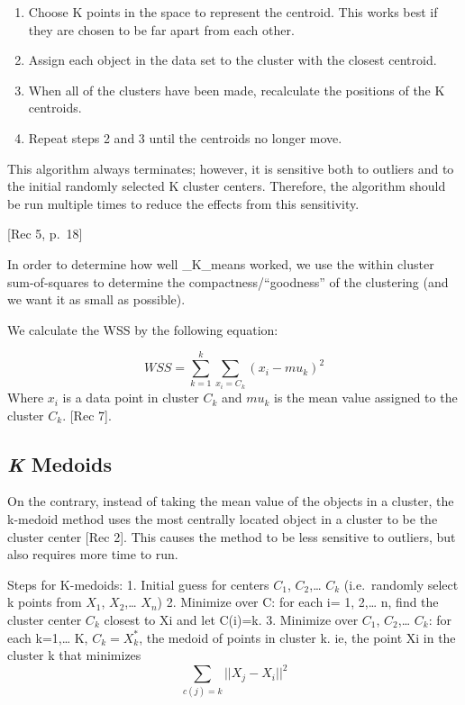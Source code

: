 \documentclass[12pt,twoside]{amherstthesis}
\providecommand{\tightlist}{%
  \setlength{\itemsep}{0pt}\setlength{\parskip}{0pt}}
\begin{document}
  \begin{enumerate}
  \def\labelenumi{\arabic{enumi}.}
  \tightlist
  \item
    Choose K points in the space to represent the centroid. This works
    best if they are chosen to be far apart from each other.
  \item
    Assign each object in the data set to the cluster with the closest
    centroid.
  \item
    When all of the clusters have been made, recalculate the positions of
    the K centroids.
  \item
    Repeat steps 2 and 3 until the centroids no longer move.
  \end{enumerate}
  
  This algorithm always terminates; however, it is sensitive both to
  outliers and to the initial randomly selected K cluster centers.
  Therefore, the algorithm should be run multiple times to reduce the
  effects from this sensitivity.
  
  {[}Rec 5, p.~18{]}
  
  In order to determine how well \_K\_means worked, we use the within
  cluster sum-of-squares to determine the compactness/``goodness'' of the
  clustering (and we want it as small as possible).
  
  We calculate the WSS by the following equation:
  
  \[WSS = \sum_{k=1}^k \sum_{x_i=C_k} ({{x_i- mu_k}})^2\] Where \(x_i\) is
  a data point in cluster \(C_k\) and \(mu_k\) is the mean value assigned
  to the cluster \(C_k\). {[}Rec 7{]}.
  
  \subsection{\texorpdfstring{\emph{K}
  Medoids}{K Medoids}}\label{k-medoids}
  
  On the contrary, instead of taking the mean value of the objects in a
  cluster, the k-medoid method uses the most centrally located object in a
  cluster to be the cluster center {[}Rec 2{]}. This causes the method to
  be less sensitive to outliers, but also requires more time to run.
  
  Steps for K-medoids: 1. Initial guess for centers \(C_1\),
  \(C_2\),\ldots{} \(C_k\) (i.e.~randomly select k points from \(X_1\),
  \(X_2\),\ldots{} \(X_n\)) 2. Minimize over C: for each i= 1, 2,\ldots{}
  n, find the cluster center \(C_k\) closest to Xi and let C(i)=k. 3.
  Minimize over \(C_1\), \(C_2\),\ldots{} \(C_k\): for each k=1,\ldots{}
  K, \(C_k = X_k^*\), the medoid of points in cluster k. ie, the point Xi
  in the cluster k that minimizes \[\sum  _{c(j)=k} ||{{X_j- X_i}}||^2\]
  
\end{document}
